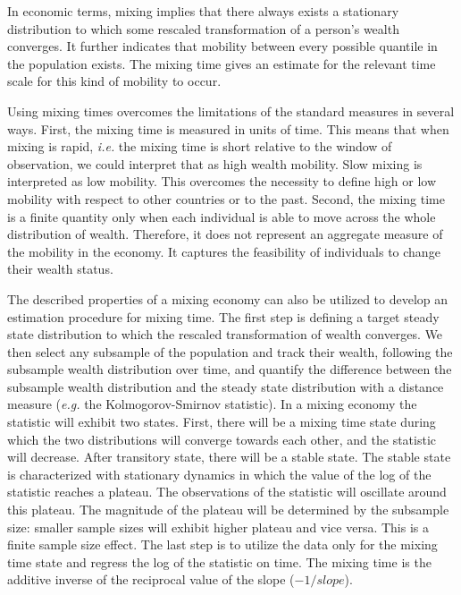\documentclass[11pt]{article}
\newcommand{\ie}{{\it i.e.}\xspace}
\newcommand{\eg}{{\it e.g.}\xspace}
\numberwithin{equation}{section}
\begin{document}
In economic terms, mixing implies that there always exists a stationary distribution to which some rescaled transformation of a person's wealth converges. It further indicates that mobility between every possible quantile in the population exists. The mixing time gives an estimate for the relevant time scale for this kind of mobility to occur.

Using mixing times overcomes the limitations of the standard measures in several ways. First, the mixing time is measured in units of time. This means that when mixing is rapid, \ie the mixing time is short relative to the window of observation, we could interpret that as high wealth mobility. Slow mixing is interpreted as low mobility. This overcomes the necessity to define high or low mobility with respect to other countries or to the past. Second, the mixing time is a finite quantity only when each individual is able to move across the whole distribution of wealth. Therefore, it does not represent an aggregate measure of the mobility in the economy. It captures the feasibility of individuals to change their wealth status.

The described properties of a mixing economy can also be utilized to develop an estimation procedure for mixing time. The first step is defining a target steady state distribution to which the rescaled transformation of wealth converges. We then select any subsample of the population and track their wealth, following the subsample wealth distribution over time, and quantify the difference between the subsample wealth distribution and the steady state distribution with a distance measure (\eg the Kolmogorov-Smirnov statistic). In a mixing economy the statistic will exhibit two states. First, there will be a mixing time state during which the two distributions will converge towards each other, and the statistic will decrease. After transitory state, there will be a stable state. The stable state is characterized with stationary dynamics in which the value of the log of the statistic reaches a plateau. The observations of the statistic will oscillate around this plateau. The magnitude of the plateau will be determined by the subsample size: smaller sample sizes will exhibit higher plateau and vice versa. This is a finite sample size effect. The last step is to utilize the data only for the mixing time state and regress the log of the statistic on time. The mixing time is the additive inverse of the reciprocal value of the slope ($-1/slope$).
\end{document}
